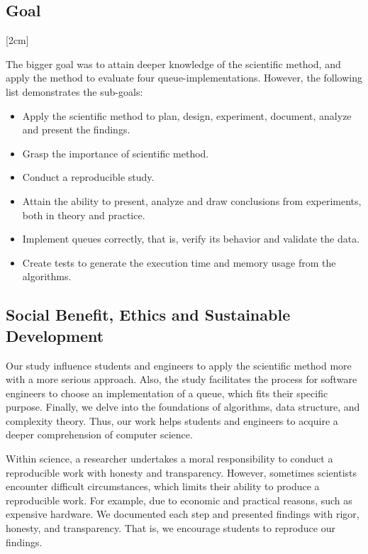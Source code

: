\documentclass[a4paper,11pt]{kth-mag}
\newcommand*{\skippara}{\par\vspace{\baselineskip} \noindent}
\begin{document}
\subsection{Goal}\label{sec:goal}
[2cm]
\skippara The bigger goal was to attain deeper knowledge of the scientific method, and apply the method to evaluate four queue-implementations.
However, the following list demonstrates the sub-goals:
\begin{itemize}
    \item Apply the scientific method to plan, design, experiment, document, analyze and present the findings.
    \item Grasp the importance of scientific method.
    \item Conduct a reproducible study.
    \item Attain the ability to present, analyze and draw conclusions from experiments, both in theory and practice.
    \item Implement queues correctly, that is, verify its behavior and validate the data.
    \item Create tests to generate the execution time and memory usage from the algorithms.
\end{itemize}

\subsection{Social Benefit, Ethics and Sustainable Development}
Our study influence students and engineers to apply the scientific method more with a more serious approach.
Also, the study facilitates the process for software engineers to choose an implementation of a queue, which fits their specific purpose.
Finally, we delve into the foundations of algorithms, data structure, and complexity theory.
Thus, our work helps students and engineers to acquire a deeper comprehension of computer science.

\skippara Within science, a researcher undertakes a moral responsibility to conduct a reproducible work with honesty and transparency.
However, sometimes scientists encounter difficult circumstances, which limits their ability to produce a reproducible work.
For example, due to economic and practical reasons, such as expensive hardware.
We documented each step and presented findings with rigor, honesty, and transparency.
That is, we encourage students to reproduce our findings.
\end{document}

